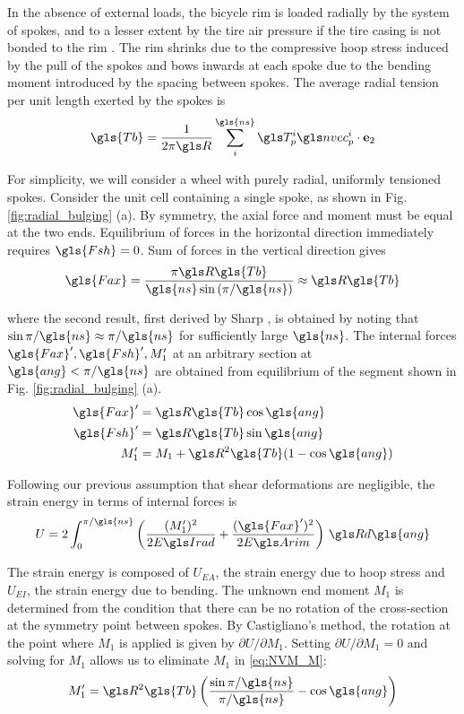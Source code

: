 \documentclass[\rootdir/thesis.tex]{subfiles}
\begin{document}
In the absence of external loads, the bicycle rim is loaded radially by the system of spokes, and to a lesser extent by the tire air pressure if the tire casing is not bonded to the rim \cite{Burgoyne1993}. The rim shrinks due to the compressive hoop stress induced by the pull of the spokes and bows inwards at each spoke due to the bending moment introduced by the spacing between spokes. The average radial tension per unit length exerted by the spokes is
\begin{equation}
\label{eq:Tbar}
\gls{Tb} = \frac{1}{2\pi \R} \sum_i^{\gls{ns}} \T_p^i \n_p^i \cdot\et
\end{equation}

For simplicity, we will consider a wheel with purely radial, uniformly tensioned spokes. Consider the unit cell containing a single spoke, as shown in Fig. \ref{fig:radial_bulging} (a). By symmetry, the axial force and moment must be equal at the two ends. Equilibrium of forces in the horizontal direction immediately requires $\gls{Fsh}=0$. Sum of forces in the vertical direction gives
\begin{equation}
\label{eq:Nr}
\gls{Fax} = \frac{\pi \R\gls{Tb}}{\gls{ns}\sin{(\pi/\gls{ns})}} \approx \R\gls{Tb}
\end{equation}

where the second result, first derived by Sharp \cite{Sharp1977}, is obtained by noting that $\sin{\pi/\gls{ns}}\approx \pi/\gls{ns}$ for sufficiently large $\gls{ns}$. The internal forces $\gls{Fax}',\gls{Fsh}',M_1'$ at an arbitrary section at $\gls{ang} < \pi/\gls{ns}$ are obtained from equilibrium of the segment shown in Fig. \ref{fig:radial_bulging} (a).
\begin{subequations}
\begin{align}
\gls{Fax}' &= \R\gls{Tb}\cos{\gls{ang}}\\
\gls{Fsh}' &= \R\gls{Tb}\sin{\gls{ang}}\\
M_1'       &= M_1 + \R^2\gls{Tb}(1-\cos{\gls{ang}})\label{eq:NVM_M}
\end{align}
\end{subequations}

Following our previous assumption that shear deformations are negligible, the strain energy in terms of internal forces is
\begin{equation}
U = 2\int_0^{\pi/\gls{ns}} \left(\frac{(M_1')^2}{2\EIr} + \frac{(\gls{Fax}')^2}{2\EA}\right)\, \R d\gls{ang}
\end{equation}

The strain energy is composed of $U_{EA}$, the strain energy due to hoop stress and $U_{EI}$, the strain energy due to bending. The unknown end moment $M_1$ is determined from the condition that there can be no rotation of the cross-section at the symmetry point between spokes. By Castigliano's method, the rotation at the point where $M_1$ is applied is given by $\partial U/\partial M_1$. Setting $\partial U/\partial M_1=0$ and solving for $M_1$ allows us to eliminate $M_1$ in \eqref{eq:NVM_M}:
\begin{equation}
M_1' = \R^2\gls{Tb} \left( \frac{\sin{\pi/\gls{ns}}}{\pi/\gls{ns}} - \cos{\gls{ang}} \right)
\end{equation}
\end{document}
